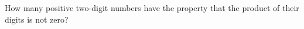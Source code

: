 How many positive two-digit numbers have the property that the product of their digits is not zero?
